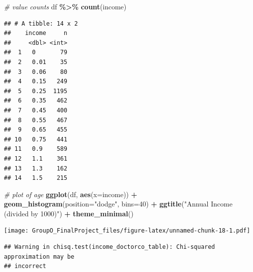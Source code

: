 \documentclass[
]{article}
\newenvironment{Shaded}{\begin{snugshade}}{\end{snugshade}}
\newcommand{\AttributeTok}[1]{\textcolor[rgb]{0.13,0.29,0.53}{#1}}
\newcommand{\CommentTok}[1]{\textcolor[rgb]{0.56,0.35,0.01}{\textit{#1}}}
\newcommand{\DecValTok}[1]{\textcolor[rgb]{0.00,0.00,0.81}{#1}}
\newcommand{\FunctionTok}[1]{\textcolor[rgb]{0.13,0.29,0.53}{\textbf{#1}}}
\newcommand{\NormalTok}[1]{#1}
\newcommand{\OtherTok}[1]{\textcolor[rgb]{0.56,0.35,0.01}{#1}}
\newcommand{\SpecialCharTok}[1]{\textcolor[rgb]{0.81,0.36,0.00}{\textbf{#1}}}
\newcommand{\StringTok}[1]{\textcolor[rgb]{0.31,0.60,0.02}{#1}}
\begin{document}
\begin{Shaded}
\begin{Highlighting}[]
\CommentTok{\# value counts}
\NormalTok{df }\SpecialCharTok{\%\textgreater{}\%} \FunctionTok{count}\NormalTok{(income)}
\end{Highlighting}
\end{Shaded}

\begin{verbatim}
## # A tibble: 14 x 2
##    income     n
##     <dbl> <int>
##  1   0       79
##  2   0.01    35
##  3   0.06    80
##  4   0.15   249
##  5   0.25  1195
##  6   0.35   462
##  7   0.45   400
##  8   0.55   467
##  9   0.65   455
## 10   0.75   441
## 11   0.9    589
## 12   1.1    361
## 13   1.3    162
## 14   1.5    215
\end{verbatim}

\begin{Shaded}
\begin{Highlighting}[]
\CommentTok{\# plot of age}
\FunctionTok{ggplot}\NormalTok{(df, }\FunctionTok{aes}\NormalTok{(}\AttributeTok{x=}\NormalTok{income)) }\SpecialCharTok{+}
  \FunctionTok{geom\_histogram}\NormalTok{(}\AttributeTok{position=}\StringTok{"dodge"}\NormalTok{, }\AttributeTok{bins=}\DecValTok{40}\NormalTok{) }\SpecialCharTok{+}
  \FunctionTok{ggtitle}\NormalTok{(}\StringTok{"Annual Income (divided by 1000)"}\NormalTok{) }\SpecialCharTok{+}
  \FunctionTok{theme\_minimal}\NormalTok{()}
\end{Highlighting}
\end{Shaded}

\texttt{[image: GroupO\_FinalProject\_files/figure-latex/unnamed-chunk-18-1.pdf]}

\begin{Shaded}
\end{Shaded}

\begin{verbatim}
## Warning in chisq.test(income_doctorco_table): Chi-squared approximation may be
## incorrect
\end{verbatim}
\end{document}
